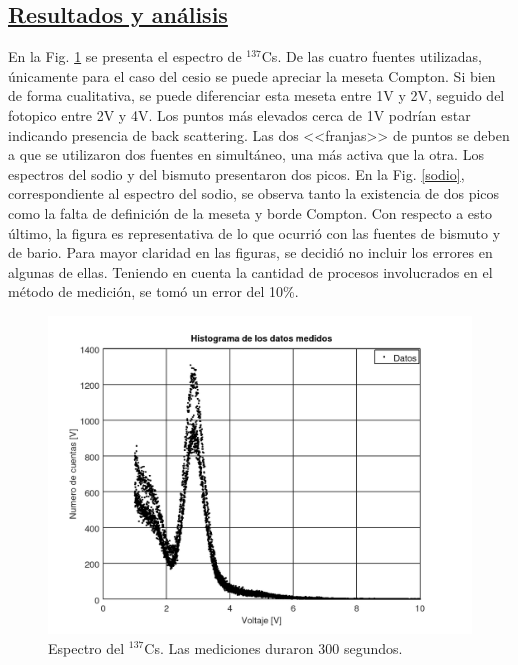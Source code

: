\documentclass[twoside]{article}
\begin{document}
\begin{multicols}{2}
\section*{\underline{Resultados y análisis}}
En la Fig. \ref{histograma} se presenta el espectro de $^{137}$Cs. De las cuatro fuentes utilizadas, únicamente para el caso del cesio se puede apreciar la meseta Compton. Si bien de forma cualitativa, se puede diferenciar esta meseta entre 1V y 2V, seguido del fotopico entre 2V y 4V. Los puntos más elevados cerca de 1V podrían estar indicando presencia de back scattering. Las dos <<franjas>> de puntos se deben a que se utilizaron dos fuentes en simultáneo, una más activa que la otra. Los espectros del sodio y del bismuto presentaron dos picos. En la Fig. \ref{sodio}, correspondiente al espectro del sodio, se observa tanto la existencia de dos picos como la falta de definición de la meseta y borde Compton. Con respecto a esto último, la figura es representativa de lo que ocurrió con las fuentes de bismuto y de bario. Para mayor claridad en las figuras, se decidió no incluir los errores en algunas de ellas. Teniendo en cuenta la cantidad de procesos involucrados en el método de medición, se tomó un error del 10\%.

\begin{figure}[H]
    \centering
    \includegraphics[scale=0.4]{espectro.png}
    \caption{Espectro del $^{137}$Cs. Las mediciones duraron 300 segundos.}
    \label{histograma}
\end{figure}


\end{multicols}
\end{document}
